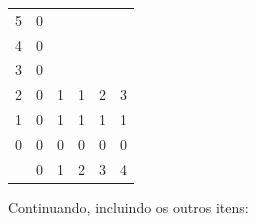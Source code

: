 \begin{example}
	\begin{center}
		\begin{tabular}{c|c|c|c|c|c|}
			\cline{2-6}
			5                                              & 0                     &                       &                       &                       &                       \\ \cline{2-6}
			4                                              & 0                     &                       &                       &                       &                       \\ \cline{2-6}
			3                                              & 0                     &                       &                       &                       &                       \\ \cline{2-6}
			2                                              & 0                     & 1                     & 1                     & 2                     & 3                     \\ \cline{2-6}
			1                                              & 0                     & 1                     & 1                     & 1                     & 1                     \\ \cline{2-6}
			0                                              & 0                     & 0                     & 0                     & 0                     & 0                     \\ \cline{2-6}
			\multicolumn{1}{c}{\diagbox[dir=NE]{$i$}{$T$}} & \multicolumn{1}{c}{0} & \multicolumn{1}{c}{1} & \multicolumn{1}{c}{2} & \multicolumn{1}{c}{3} & \multicolumn{1}{c}{4}
		\end{tabular}
	\end{center}

	Continuando, incluindo os outros itens:


\end{example}
